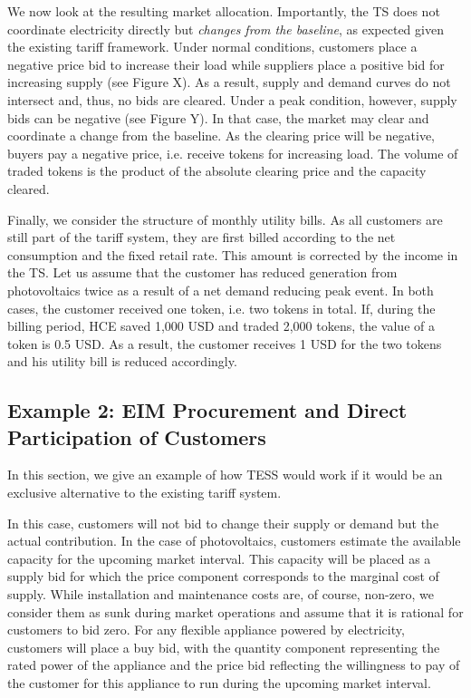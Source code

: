 We now look at the resulting market allocation. Importantly, the TS does not coordinate electricity directly but \textit{changes from the baseline}, as expected given the existing tariff framework.
Under normal conditions, customers place a negative price bid to increase their load while suppliers place a positive bid for increasing supply (see Figure X). As a result, supply and demand curves do not intersect and, thus, no bids are cleared. Under a peak condition, however, supply bids can be negative (see Figure Y). In that case, the market may clear and coordinate a change from the baseline. As the clearing price will be negative, buyers pay a negative price, i.e. receive tokens for increasing load. The volume of traded tokens is the product of the absolute clearing price and the capacity cleared.

Finally, we consider the structure of monthly utility bills. As all customers are still part of the tariff system, they are first billed according to the net consumption and the fixed retail rate. This amount is corrected by the income in the TS. Let us assume that the customer has reduced generation from photovoltaics twice as a result of a net demand reducing peak event. In both cases, the customer received one token, i.e. two tokens in total. If, during the billing period, HCE saved 1,000 USD and traded 2,000 tokens, the value of a token is 0.5 USD. As a result, the customer receives 1 USD for the two tokens and his utility bill is reduced accordingly.

\subsection{Example 2: EIM Procurement and Direct Participation of Customers}

In this section, we give an example of how TESS would work if it would be an exclusive alternative to the existing tariff system. 

In this case, customers will not bid to change their supply or demand but the actual contribution. In the case of photovoltaics, customers estimate the available capacity for the upcoming market interval. This capacity will be placed as a supply bid for which the price component corresponds to the marginal cost of supply. While installation and maintenance costs are, of course, non-zero, we consider them as sunk during market operations and assume that it is rational for customers to bid zero. For any flexible appliance powered by electricity, customers will place a buy bid, with the quantity component representing the rated power of the appliance and the price bid reflecting the willingness to pay of the customer for this appliance to run during the upcoming market interval.

